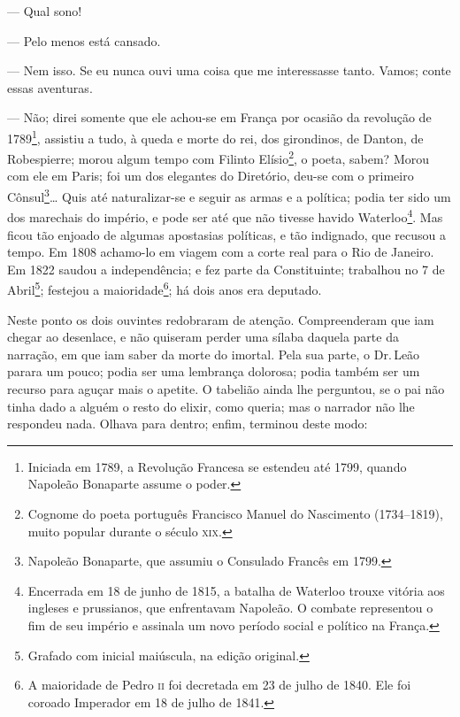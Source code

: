 --- Qual sono!

--- Pelo menos está cansado.

--- Nem isso. Se eu nunca ouvi uma coisa que me interessasse tanto.
Vamos; conte essas aventuras.

--- Não; direi somente que ele achou-se em França por ocasião da
revolução de 1789\footnote{Iniciada em 1789, a Revolução Francesa se
  estendeu até 1799, quando Napoleão Bonaparte assume o poder.},
assistiu a tudo, à queda e morte do rei, dos girondinos, de Danton, de
Robespierre; morou algum tempo com Filinto Elísio\footnote{Cognome do
  poeta português Francisco Manuel do Nascimento (1734--1819), muito
  popular durante o século \textsc{xix}.}, o poeta, sabem? Morou com ele em
Paris; foi um dos elegantes do Diretório, deu-se com o primeiro
Cônsul\footnote{Napoleão Bonaparte, que assumiu o Consulado Francês em
  1799.}\ldots{} Quis até naturalizar-se e seguir as armas e a política;
podia ter sido um dos marechais do império, e pode ser até que não
tivesse havido Waterloo\footnote{Encerrada em 18 de junho de 1815, a
  batalha de Waterloo trouxe vitória aos ingleses e prussianos, que
  enfrentavam Napoleão. O combate representou o fim de seu império e
  assinala um novo período social e político na França.}. Mas ficou tão
enjoado de algumas apostasias políticas, e tão indignado, que recusou a
tempo. Em 1808 achamo-lo em viagem com a corte real para o Rio de
Janeiro. Em 1822 saudou a independência; e fez parte da Constituinte;
trabalhou no 7 de Abril\footnote{Grafado com inicial maiúscula, na
  edição original.}; festejou a maioridade\footnote{A maioridade de
  Pedro \textsc{ii} foi decretada em 23 de julho de 1840. Ele foi coroado
  Imperador em 18 de julho de 1841.}; há dois anos era deputado.

Neste ponto os dois ouvintes redobraram de atenção. Compreenderam que
iam chegar ao desenlace, e não quiseram perder uma sílaba daquela parte
da narração, em que iam saber da morte do imortal. Pela sua parte, o Dr.\,Leão parara um pouco; podia ser uma lembrança dolorosa; podia também ser
um recurso para aguçar mais o apetite. O tabelião ainda lhe perguntou,
se o pai não tinha dado a alguém o resto do elixir, como queria; mas o
narrador não lhe respondeu nada. Olhava para dentro; enfim, terminou
deste modo:

